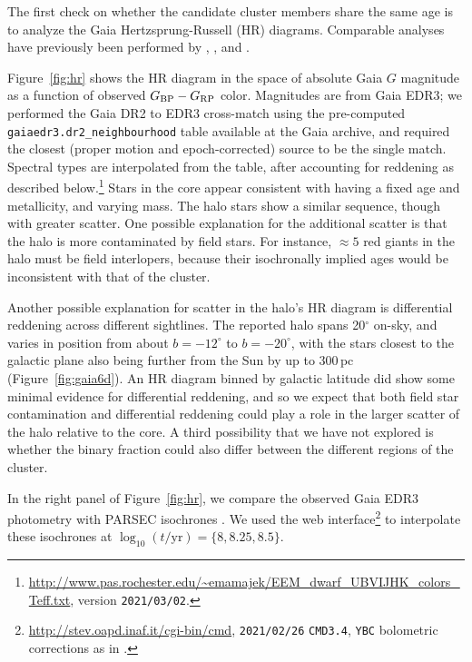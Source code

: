 \documentclass[12pt,twocolumn,tighten]{aastex63}
\newcommand{\bpmrp}{G_{\rm BP}-G_{\rm RP}}
\begin{document}
The first check on whether the candidate cluster members share the
same age is to analyze the Gaia Hertzsprung-Russell (HR) diagrams.
Comparable analyses have previously been performed by
,
, and .

Figure~\ref{fig:hr} shows the HR diagram in the space of absolute Gaia
$G$ magnitude as a function of observed $\bpmrp$ color.  Magnitudes
are from Gaia EDR3; we performed the Gaia DR2 to EDR3 cross-match
using the pre-computed \texttt{gaiaedr3.dr2\_neighbourhood} table
available at the Gaia archive, and required the closest (proper motion
and epoch-corrected) source to be the single match.  Spectral types
are interpolated from the \citet{pecaut_mamajek_2013} table, after
accounting for reddening as described
below.\footnote{\url{http://www.pas.rochester.edu/~emamajek/EEM_dwarf_UBVIJHK_colors_Teff.txt},
version \texttt{2021/03/02}.} Stars in the core appear consistent with having a
fixed age and metallicity, and varying mass.  The halo stars show a
similar sequence, though with greater scatter.  One possible
explanation for the additional scatter is that the halo is more
contaminated by field stars.  For instance, $\approx5$ red giants in
the halo must be field interlopers, because their isochronally implied
ages would be inconsistent with that of the cluster.

Another possible explanation for scatter in the halo's HR diagram
is differential reddening across different sightlines.  The
reported halo spans 20$^\circ$ on-sky, and varies in position from
about $b=-12^\circ$ to $b=-20^\circ$, with the stars closest to the
galactic plane also being further from the Sun by up to 300\,pc
(Figure~\ref{fig:gaia6d}).  An HR diagram binned by galactic latitude
did show some minimal evidence for differential reddening, and so we
expect that both field star contamination and differential reddening
could play a role in the larger scatter of the halo relative to the
core.  A third possibility that we have not explored is whether the
binary fraction could also differ between the different regions of the
cluster.

In the right panel of Figure~\ref{fig:hr}, we compare the observed
Gaia EDR3 photometry with PARSEC isochrones
\citep{bressan_parsec_2012,chen_improving_2014,chen_parsec_2015,marigo_new_2017}.
We used the web
interface\footnote{\url{http://stev.oapd.inaf.it/cgi-bin/cmd},
\texttt{2021/02/26} \texttt{CMD3.4}, \texttt{YBC} bolometric
corrections as in \citet{chen_2019_YBC}.} to interpolate these
isochrones at $\log_{10}(t/\mathrm{yr})=\{8, 8.25, 8.5\}$.
\end{document}
